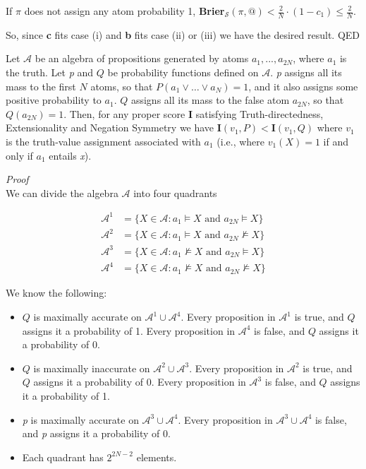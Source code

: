 \documentclass[
  10pt,
  letterpaper,
  DIV=11,
  numbers=noendperiod,
  twoside]{scrartcl}
\providecommand{\tightlist}{%
  \setlength{\itemsep}{0pt}\setlength{\parskip}{0pt}}\usepackage{longtable,booktabs,array}
\begin{document}
If \(\pi\) does not assign any atom probability 1,
\textbf{Brier}\(_\mathscr{S}(\pi, @) < \frac{2}{N}\cdot(1 - c_1) \leq \frac{2}{N}\).

So, since \textbf{c} fits case (i) and \textbf{b} fits case (ii) or
(iii) we have the desired result. QED

\begin{description}
\tightlist
\item[Theorem-3]
Let \(\mathscr{A}\) be an algebra of propositions generated by atoms
\(a_1, ..., a_{2N}\), where \(a_1\) is the truth. Let \emph{p} and \(Q\)
be probability functions defined on \(\mathscr{A}\). \emph{p} assigns
all its mass to the first \(N\) atoms, so that
\(P(a_1 \vee \dots \vee a_N) = 1\), and it also assigns some positive
probability to \(a_1\). \(Q\) assigns all its mass to the false atom
\(a_{2N}\), so that \(Q(a_{2N}) = 1\). Then, for any proper score
\textbf{I} satisfying Truth-directedness, Extensionality and Negation
Symmetry we have \(\mathbf{I}(v_1, P) < \mathbf{I}(v_1, Q)\) where
\(v_1\) is the truth-value assignment associated with \(a_1\) (i.e.,
where \(v_1(X) = 1\) if and only if \(a_1\) entails \emph{x}).
\end{description}

\emph{Proof}\\
We can divide the algebra \(\mathscr{A}\) into four quadrants

\[
\begin{aligned}
\mathscr{A}^1 &= \{X \in \mathscr{A}: a_1 \vDash X \text{ and } a_{2N} \vDash X\} \\
\mathscr{A}^2 &= \{X \in \mathscr{A}: a_1 \vDash X \text{ and } a_{2N} \nvDash X\} \\
\mathscr{A}^3 &= \{X \in \mathscr{A}: a_1 \nvDash X \text{ and } a_{2N} \vDash X\} \\
\mathscr{A}^4 &= \{X \in \mathscr{A}: a_1 \nvDash X \text{ and } a_{2N} \nvDash X\}
\end{aligned}
\]

We know the following:

\begin{itemize}
\tightlist
\item
  \(Q\) is maximally accurate on \(\mathscr{A}^1 \cup \mathscr{A}^4\).
  Every proposition in \(\mathscr{A}^1\) is true, and \(Q\) assigns it a
  probability of 1. Every proposition in \(\mathscr{A}^4\) is false, and
  \(Q\) assigns it a probability of 0.
\item
  \(Q\) is maximally inaccurate on \(\mathscr{A}^2 \cup \mathscr{A}^3\).
  Every proposition in \(\mathscr{A}^2\) is true, and \(Q\) assigns it a
  probability of 0. Every proposition in \(\mathscr{A}^3\) is false, and
  \(Q\) assigns it a probability of 1.
\item
  \emph{p} is maximally accurate on
  \(\mathscr{A}^3 \cup \mathscr{A}^4\). Every proposition in
  \(\mathscr{A}^3 \cup \mathscr{A}^4\) is false, and \emph{p} assigns it
  a probability of 0.
\item
  Each quadrant has \(2^{2N-2}\) elements.
\end{itemize}
\end{document}
